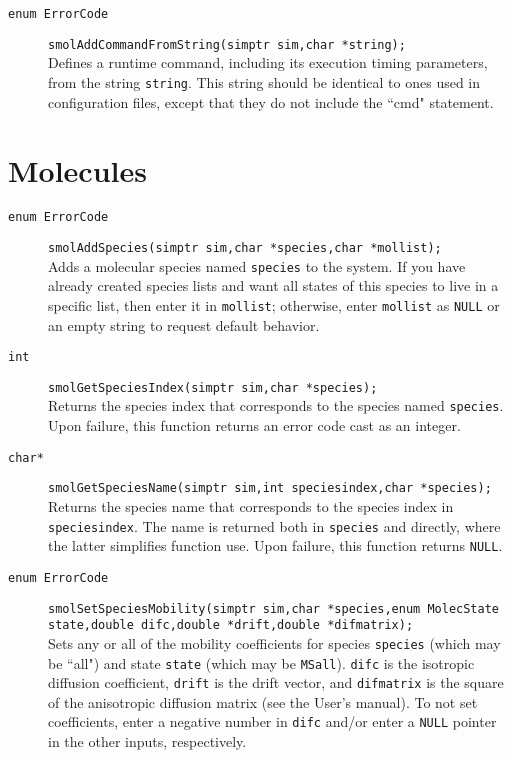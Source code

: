 \documentclass {book}
\begin{document}
\begin{description}
\item[\texttt{enum ErrorCode}]
\texttt{smolAddCommandFromString(simptr sim,char *string);}
\hfill \\
Defines a runtime command, including its execution timing parameters, from the string \texttt{string}. This string should be identical to ones used in configuration files, except that they do not include the ``cmd" statement.

\end{description}

\section{Molecules}

\begin{description}

\item[\texttt{enum ErrorCode}]
\texttt{smolAddSpecies(simptr sim,char *species,char *mollist);}
\hfill \\
Adds a molecular species named \texttt{species} to the system. If you have already created species lists and want all states of this species to live in a specific list, then enter it in \texttt{mollist}; otherwise, enter \texttt{mollist} as \texttt{NULL} or an empty string to request default behavior.

\item[\texttt{int}]
\texttt{smolGetSpeciesIndex(simptr sim,char *species);}
\hfill \\
Returns the species index that corresponds to the species named \texttt{species}. Upon failure, this function returns an error code cast as an integer.

\item[\texttt{char*}]
\texttt{smolGetSpeciesName(simptr sim,int speciesindex,char *species);}
\hfill \\
Returns the species name that corresponds to the species index in \texttt{speciesindex}. The name is returned both in \texttt{species} and directly, where the latter simplifies function use. Upon failure, this function returns \texttt{NULL}.

\item[\texttt{enum ErrorCode}]
\texttt{smolSetSpeciesMobility(simptr sim,char *species,enum MolecState state,double difc,double *drift,double *difmatrix);}
\hfill \\
Sets any or all of the mobility coefficients for species \texttt{species} (which may be ``all") and state \texttt{state} (which may be \texttt{MSall}). \texttt{difc} is the isotropic diffusion coefficient, \texttt{drift} is the drift vector, and \texttt{difmatrix} is the square of the anisotropic diffusion matrix (see the User's manual). To not set coefficients, enter a negative number in \texttt{difc} and/or enter a \texttt{NULL} pointer in the other inputs, respectively.


\end{description}
\end{document}
